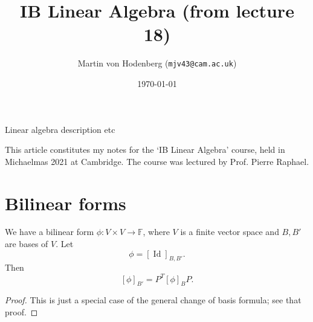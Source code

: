 \documentclass[a4paper]{scrartcl}
\title{IB Linear Algebra (from lecture 18)}
\author{Martin von Hodenberg (\texttt{mjv43@cam.ac.uk})}
\date{\today}
\begin{document}
\maketitle

Linear algebra description etc

This article constitutes my notes for the `IB Linear Algebra' course, held in Michaelmas 2021 at Cambridge. The course was lectured by Prof. Pierre Raphael.


\tableofcontents

\section{Bilinear forms}
\begin{lemma}
    We have a bilinear form $\phi: V \times V \rightarrow \mathbb{F}$, where $V$ is a finite vector space and $B, B'$ are bases of $V$. Let 
    \[\phi=[\operatorname{Id}]_{B,B'}.\]
     Then 
    \[[\phi]_{B'}=P^T [\phi]_B P.\]
\end{lemma}
\begin{proof}
     This is just a special case of the general change of basis formula; see that proof.
\end{proof}
\end{document}
